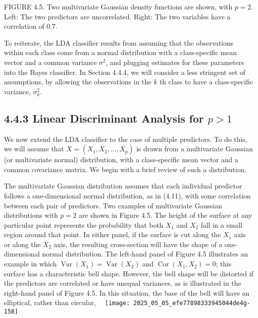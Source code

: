 \documentclass[10pt]{article}
\begin{document}
FIGURE 4.5. Two multivariate Gaussian density functions are shown, with $p=2$. Left: The two predictors are uncorrelated. Right: The two variables have a correlation of 0.7.

To reiterate, the LDA classifier results from assuming that the observations within each class come from a normal distribution with a class-specific mean vector and a common variance $\sigma^{2}$, and plugging estimates for these parameters into the Bayes classifier. In Section 4.4.4, we will consider a less stringent set of assumptions, by allowing the observations in the $k$ th class to have a class-specific variance, $\sigma_{k}^{2}$.

\subsection*{4.4.3 Linear Discriminant Analysis for $p>1$}
We now extend the LDA classifier to the case of multiple predictors. To do this, we will assume that $X=\left(X_{1}, X_{2}, \ldots, X_{p}\right)$ is drawn from a multivariate Gaussian (or multivariate normal) distribution, with a class-specific mean vector and a common covariance matrix. We begin with a brief review of such a distribution.

The multivariate Gaussian distribution assumes that each individual predictor follows a one-dimensional normal distribution, as in (4.11), with some correlation between each pair of predictors. Two examples of multivariate Gaussian distributions with $p=2$ are shown in Figure 4.5. The height of the surface at any particular point represents the probability that both $X_{1}$ and $X_{2}$ fall in a small region around that point. In either panel, if the surface is cut along the $X_{1}$ axis or along the $X_{2}$ axis, the resulting cross-section will have the shape of a one-dimensional normal distribution. The left-hand panel of Figure 4.5 illustrates an example in which $\operatorname{Var}\left(X_{1}\right)=\operatorname{Var}\left(X_{2}\right)$ and $\operatorname{Cor}\left(X_{1}, X_{2}\right)=0$; this surface has a characteristic bell shape. However, the bell shape will be distorted if the predictors are correlated or have unequal variances, as is illustrated in the right-hand panel of Figure 4.5. In this situation, the base of the bell will have an elliptical, rather than circular,\
\
\texttt{[image: 2025\_05\_05\_efe77898333945044de4g-158]}
\end{document}
